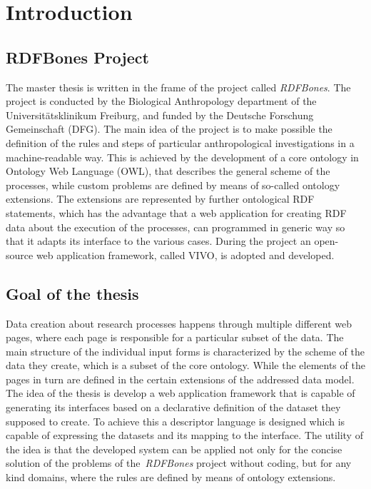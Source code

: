 \chapter{Introduction}


\section{RDFBones Project}

The master thesis is written in the frame of the project called \textit{RDFBones}. The project is conducted by the Biological Anthropology department of the Universitätsklinikum Freiburg, and funded by the Deutsche Forschung Gemeinschaft (DFG). The main idea of the project is to make possible the definition of the rules and steps of particular anthropological investigations in a machine-readable way. This is achieved by the development of a core ontology in Ontology Web Language (OWL), that describes the general scheme of the processes, while custom problems are defined by means of so-called ontology extensions. The extensions are represented by further ontological RDF statements, which has the advantage that a web application for creating RDF data about the execution of the processes, can programmed in generic way so that it adapts its interface to the various cases. During the project an open-source web application framework, called VIVO, is adopted and developed.

\section{Goal of the thesis}

Data creation about research processes happens through multiple different web pages, where each page is responsible for a particular subset of the data. The main structure of the individual input forms is characterized by the scheme of the data they create, which is a subset of the core ontology. While the elements of the pages in turn are defined in the certain extensions of the addressed data model. The idea of the thesis is develop a web application framework that is capable of generating its interfaces based on a declarative definition of the dataset they supposed to create. To achieve this a descriptor language is designed which is capable of expressing the datasets and its mapping to the interface. The utility of the idea is that the developed system can be applied not only for the concise solution of the problems of the \textit{RDFBones} project without coding, but for any kind domains, where the rules are defined by means of ontology extensions.


